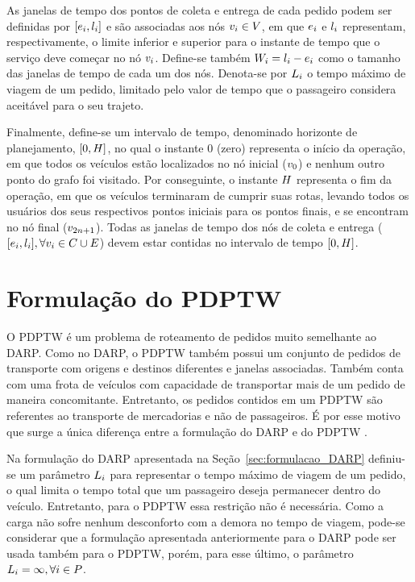 As janelas de tempo dos pontos de coleta e entrega de cada pedido podem ser
definidas por $[e_{i},l_{i}]$ e são 
associadas aos nós $v_{i} \in V$, em que $e_{i}$ e 
$l_{i}$ representam, respectivamente, o limite inferior e 
superior para o instante de tempo que o serviço deve começar no nó $v_{i}$.
Define-se também $W_{i} = l_{i} 
- e_{i}$ como o tamanho das janelas de tempo 
de cada um dos nós. Denota-se por $L_i$ o tempo máximo de 
viagem de um pedido, limitado pelo valor de tempo que o passageiro considera 
aceitável para o seu trajeto. 

Finalmente, define-se um intervalo de tempo, denominado horizonte de
planejamento, $[0, H]$, no qual o instante $0$ (zero) representa
o início da operação, em que todos os veículos estão localizados no nó inicial 
($v_{0}$) e nenhum outro ponto do grafo foi visitado.
Por conseguinte, o instante $H$ representa o fim da operação, 
em que os veículos terminaram de cumprir suas rotas, levando todos os usuários 
dos seus respectivos pontos iniciais para os pontos finais, e se 
encontram no nó final ($v_{2n + 1}$). Todas as janelas de tempo dos nós de
coleta e entrega ($[e_i, l_i], 
\forall v_{i} \in C \cup E$) devem estar contidas 
no intervalo de tempo $[0, H]$.

\section{Formulação do PDPTW}\label{sec:formulacao_PDPTW}

O PDPTW é um problema de roteamento de pedidos muito semelhante ao DARP.
Como no DARP, o PDPTW também possui um conjunto de pedidos de transporte com
origens e destinos diferentes e janelas associadas.
Também conta com uma frota de veículos com capacidade de transportar mais de um
pedido de maneira concomitante.
Entretanto, os pedidos contidos em um PDPTW são referentes ao transporte de
mercadorias e não de passageiros.
É por esse motivo que surge a única diferença entre a formulação do DARP e do
PDPTW \cite{parragh_survey_2008}.

Na formulação do DARP apresentada na Seção~\ref{sec:formulacao_DARP} definiu-se
um parâmetro $L_i$ para representar o tempo máximo de viagem
de um pedido, o qual limita o tempo total que um passageiro deseja permanecer
dentro do veículo.
Entretanto, para o PDPTW essa restrição não é necessária. Como a carga não
sofre nenhum desconforto com a demora no tempo de viagem, pode-se considerar 
que a formulação apresentada anteriormente para o DARP pode ser usada também 
para o PDPTW, porém, para esse último, o parâmetro 
$L_i = \infty, \forall i \in P$.

